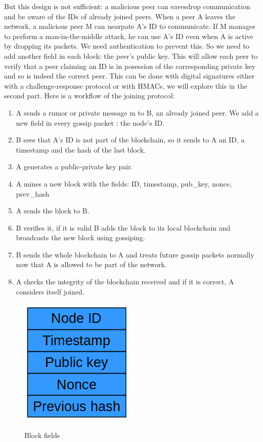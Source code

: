 \documentclass[twocolumn]{article}
\begin{document}
\linebreak
\linebreak
But this design is not sufficient: a malicious peer can eavesdrop communication and be aware of the IDs of already joined peers. When a peer A leaves the network, a malicious peer M can usurpate A’s ID to communicate. If M manages to perform a man-in-the-middle attack, he can use A’s ID even when A is active by dropping its packets. We need authentication to prevent this. So we need to add another field in each block: the peer’s public key. This will allow each peer to verify that a peer claiming an ID is in posession of the corresponding private key and so is indeed the correct peer. This can be done with digital signatures either with a challenge-response protocol or with HMACs, we will explore this in the second part.
\linebreak
\linebreak
Here is a workflow of the joining protocol:
\begin{enumerate}
	\item A sends a rumor or private message m to B, an already joined peer. We add a new field in every gossip packet : the node's ID.
	\item B sees that A’s ID is not part of the blockchain, so it sends to A an ID, a timestamp and the hash of the last block.
	\item A generates a public-private key pair.
	\item A mines a new block with the fields: ID, timestamp, pub\_key, nonce, prev\_hash
	\item A sends the block to B.
	\item B verifies it, if it is valid B adds the block to its local blockchain and broadcasts the new block using gossiping.
	\item B sends the whole blockchain to A and treats future gossip packets normally now that A is allowed to be part of the network.
	\item A checks the integrity of the blockchain received and if it is correct, A considers itself joined. 
\end{enumerate}
\begin{figure}[h]
	\caption{Block fields}
	\centering
	\includegraphics[scale=0.7]{block}
	\label{fig:block}
\end{figure}
\end{document}
